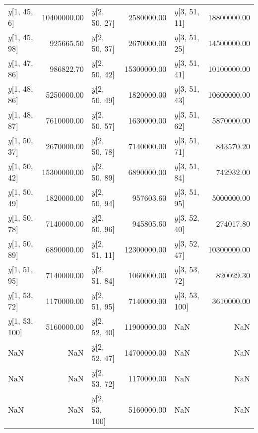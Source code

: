 \begin{longtable}{lrlrlr}
$y$[1, 45, 6] & 10400000.00 & $y$[2, 50, 27] & 2580000.00 & $y$[3, 51, 11] & 18800000.00 \\
$y$[1, 45, 98] & 925665.50 & $y$[2, 50, 37] & 2670000.00 & $y$[3, 51, 25] & 14500000.00 \\
$y$[1, 47, 86] & 986822.70 & $y$[2, 50, 42] & 15300000.00 & $y$[3, 51, 41] & 10100000.00 \\
$y$[1, 48, 86] & 5250000.00 & $y$[2, 50, 49] & 1820000.00 & $y$[3, 51, 43] & 10600000.00 \\
$y$[1, 48, 87] & 7610000.00 & $y$[2, 50, 57] & 1630000.00 & $y$[3, 51, 62] & 5870000.00 \\
$y$[1, 50, 37] & 2670000.00 & $y$[2, 50, 78] & 7140000.00 & $y$[3, 51, 71] & 843570.20 \\
$y$[1, 50, 42] & 15300000.00 & $y$[2, 50, 89] & 6890000.00 & $y$[3, 51, 84] & 742932.00 \\
$y$[1, 50, 49] & 1820000.00 & $y$[2, 50, 94] & 957603.60 & $y$[3, 51, 95] & 5000000.00 \\
$y$[1, 50, 78] & 7140000.00 & $y$[2, 50, 96] & 945805.60 & $y$[3, 52, 40] & 274017.80 \\
$y$[1, 50, 89] & 6890000.00 & $y$[2, 51, 11] & 12300000.00 & $y$[3, 52, 47] & 10300000.00 \\
$y$[1, 51, 95] & 7140000.00 & $y$[2, 51, 84] & 1060000.00 & $y$[3, 53, 72] & 820029.30 \\
$y$[1, 53, 72] & 1170000.00 & $y$[2, 51, 95] & 7140000.00 & $y$[3, 53, 100] & 3610000.00 \\
$y$[1, 53, 100] & 5160000.00 & $y$[2, 52, 40] & 11900000.00 & NaN & NaN \\
NaN & NaN & $y$[2, 52, 47] & 14700000.00 & NaN & NaN \\
NaN & NaN & $y$[2, 53, 72] & 1170000.00 & NaN & NaN \\
NaN & NaN & $y$[2, 53, 100] & 5160000.00 & NaN & NaN \\
\end{longtable}

